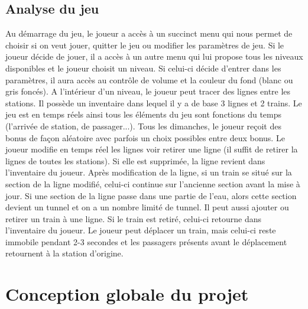 \documentclass[report, backcover, french, nodocumentinfo]{upmethodology-document}
\begin{document}
		\section{Analyse du jeu}
			\p{}
				Au démarrage du jeu, le joueur a accès à un succinct menu qui nous permet de choisir si on veut jouer, quitter le jeu ou modifier les paramètres de jeu. Si le joueur décide de jouer, il a accès à un autre menu qui lui propose tous les niveaux disponibles et le joueur choisit un niveau. Si celui-ci décide d'entrer dans les paramètres, il aura accès au contrôle de volume et la couleur du fond (blanc ou gris foncés).
			\p{}
				A l'intérieur d'un niveau, le joueur peut tracer des lignes entre les stations. Il possède un inventaire dans lequel il y a de base 3 lignes et 2 trains. Le jeu est en temps réels ainsi tous les éléments du jeu sont fonctions du temps (l'arrivée de station, de passager...). Tous les dimanches, le joueur reçoit des bonus de façon aléatoire avec parfois un choix possibles entre deux bonus.
			\p{}
				Le joueur modifie en temps réel les lignes voir retirer une ligne (il suffit de retirer la lignes de toutes les stations). Si elle est supprimée, la ligne revient dans l'inventaire du joueur. Après modification de la ligne, si un train se situé sur la section de la ligne modifié, celui-ci continue sur l'ancienne section avant la mise à jour. Si une section de la ligne passe dans une partie de l'eau, alors cette section devient un tunnel et on a un nombre limité de tunnel.
			\p{}
				Il peut aussi ajouter ou retirer un train à une ligne. Si le train est retiré, celui-ci retourne dans l'inventaire du joueur. Le joueur peut déplacer un train, mais celui-ci reste immobile pendant 2-3 secondes et les passagers présents avant le déplacement retournent à la station d'origine.

	\chapter{Conception globale du projet}
\end{document}
